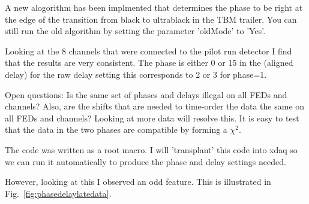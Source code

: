 A new alogorithm has been implmented that determines the phase to be right at the edge of the transition from black to ultrablack in the TBM trailer. You can still run the old algorithm by setting the parameter 'oldMode' to 'Yes'.

Looking at the 8 channels that were connected to the pilot run detector I find that the results are very consistent. The phase is either 0 or 15 in the (aligned delay) for the raw delay setting this corresponds to 2 or 3 for phase=1.

Open questions: Is the same set of phases and delays illegal on all FEDs and channels? Also, are the shifts that are needed to time-order the data the same on all FEDs and channels? Looking at more data will resolve this. It is easy to test that the data in the two phases are compatible by forming a $\chi^2$.

The code was written as a root macro. I will 'transplant' this code into xdaq so we can run it automatically to produce the phase and delay settings needed.

However, looking at this I observed an odd feature. This is illustrated in Fig.~\ref{fig:phasedelaylatedata}.

